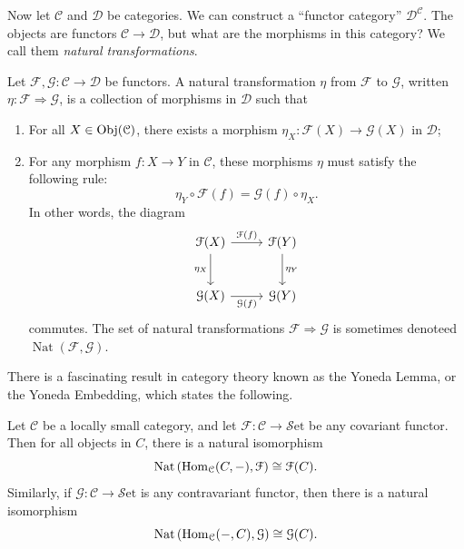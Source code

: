 \documentclass[11pt, letterpaper]{article}
\newcommand{\Set}{\mathcal{S}\mathrm{et}}
\begin{document}
Now let $\mathcal{C} $ and $\mathcal{D} $ be categories. We can construct a ``functor category'' $\mathcal{D} ^{\mathcal{C} } $. The objects are functors $\mathcal{C} \to \mathcal{D} $, but what are the morphisms in this category? We call them \emph{natural transformations}.
\begin{definition}\label{dfn:7}
	Let $\mathcal{F} ,\mathcal{G} : \mathcal{C}  \to \mathcal{D} $ be functors. A natural transformation $\eta $ from $\mathcal{F} $ to $\mathcal{G} $, written $\eta : \mathcal{F}  \Rightarrow \mathcal{G} $, is a collection of morphisms in $\mathcal{D} $ such that
	\begin{enumerate}
		\item For all $X\in \operatorname{Obj}(\mathcal{C} ) $, there exists a morphism $\eta _X : \mathcal{F} (X) \to \mathcal{G} (X)$ in $\mathcal{D} $;
		\item For any morphism $f : X \to Y$ in $\mathcal{C} $, these morphisms $\eta $ must satisfy the following rule:
			\[
				\eta_Y \circ \mathcal{F} (f)=\mathcal{G} (f)\circ \eta_X
			.\]
			In other words, the diagram
			\[\begin{tikzcd}[row sep = 2.5em, column sep = 2.5em]
				\mathcal{F} (X)\ar[r, "\mathcal{F} (f)"]\ar[d, "\eta_X"']&\mathcal{F} (Y)\ar[d, "\eta _Y"]\\
				\mathcal{G} (X)\ar[r, "\mathcal{G} (f)"']&\mathcal{G} (Y)
			\end{tikzcd}\]
			commutes. The set of natural transformations $\mathcal{F}  \Rightarrow \mathcal{G} $ is sometimes denoteed $\operatorname{Nat}(\mathcal{F} ,\mathcal{G} )$.
	\end{enumerate}
\end{definition}

There is a fascinating result in category theory known as the Yoneda Lemma, or the Yoneda Embedding, which states the following.

\begin{lemma}[Yoneda]\label{lma:1}
	Let $\mathcal{C} $ be a locally small category, and let $\mathcal{F} : \mathcal{C}  \to \Set $ be any covariant functor. Then for all objects in $C$, there is a natural isomorphism
	\[
		\operatorname{Nat} \left( \operatorname{Hom}_{\mathcal{C} }(C, -) ,\mathcal{F}  \right) \cong \mathcal{F} (C)
	.\]
	Similarly, if $\mathcal{G} : \mathcal{C}  \to \Set $ is any contravariant functor, then there is a natural isomorphism
	\[
		\operatorname{Nat} \left( \operatorname{Hom}_{\mathcal{C} }(-, C) ,\mathcal{G}  \right) \cong \mathcal{G} (C)
	.\]
\end{lemma}
\end{document}
